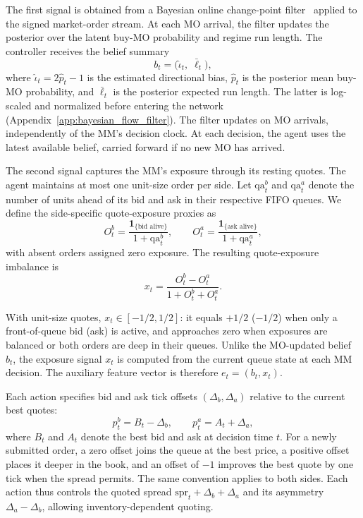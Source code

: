 \documentclass[11pt,a4paper]{article}
\begin{document}
The first signal is obtained from a Bayesian online
change-point filter~\citep{adams2007bocpd} applied to the
signed market-order stream. At each MO arrival, the filter
updates the posterior over the latent buy-MO probability
and regime run length. The controller receives the belief
summary
\begin{equation}
  b_t = \bigl(\widehat{\iota}_t,\;\bar{\ell}_t\bigr),
  \label{eq:phaseb_belief_summary}
\end{equation}
where $\widehat{\iota}_t=2\widehat p_t-1$ is the estimated
directional bias, $\widehat p_t$ is the posterior mean buy-MO
probability, and $\bar{\ell}_t$ is the posterior expected
run length. The latter is log-scaled and normalized before
entering the network (Appendix~\ref{app:bayesian_flow_filter}).
The filter updates on MO arrivals, independently of the
MM's decision clock. At each decision, the agent uses the
latest available belief, carried forward if no new MO
has arrived.

The second signal captures the MM's exposure through its resting
quotes. The agent maintains at most one unit-size order per side.
Let $\mathrm{qa}_t^b$ and $\mathrm{qa}_t^a$ denote the number of
units ahead of its bid and ask in their respective FIFO queues.
We define the side-specific quote-exposure proxies as
\begin{equation}
  O_t^{b}=
  \frac{\mathbf 1_{\{\text{bid alive}\}}}{1+\mathrm{qa}_t^b},
  \qquad
  O_t^{a}=
  \frac{\mathbf 1_{\{\text{ask alive}\}}}{1+\mathrm{qa}_t^a},
\end{equation}
with absent orders assigned zero exposure. The resulting
quote-exposure imbalance is
\begin{equation}
  x_t
  =
  \frac{O_t^{b}-O_t^{a}}{1+O_t^{b}+O_t^{a}}.
  \label{eq:quote_exposure_imbalance}
\end{equation}

With unit-size quotes, $x_t\in[-1/2,1/2]$: it equals
$+1/2$ ($-1/2$) when only a front-of-queue bid (ask)
is active, and approaches zero when exposures are
balanced or both orders are deep in their queues.
Unlike the MO-updated belief $b_t$, the exposure signal
$x_t$ is computed from the current queue state at each
MM decision. The auxiliary feature vector is therefore
$e_t=(b_t,x_t)$.


Each action specifies bid and ask tick offsets $(\Delta_b,\Delta_a)$
relative to the current best quotes:
\begin{equation}
    p_t^b = B_t-\Delta_b,
    \qquad
    p_t^a = A_t+\Delta_a,
\end{equation}
where $B_t$ and $A_t$ denote the best bid and ask at decision
time $t$. For a newly submitted order, a zero offset joins
the queue at the best price, a positive offset places it deeper
in the book, and an offset of $-1$ improves the best quote by
one tick when the spread permits. The same convention applies
to both sides. Each action thus controls the quoted spread
$\mathrm{spr}_t+\Delta_b+\Delta_a$ and its asymmetry
$\Delta_a-\Delta_b$, allowing inventory-dependent quoting.
\end{document}
